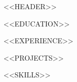 \documentclass[letterpaper,11pt]{article}
\begin{document}
<<HEADER>>

<<EDUCATION>>

<<EXPERIENCE>>

<<PROJECTS>>

<<SKILLS>>
\end{document}
